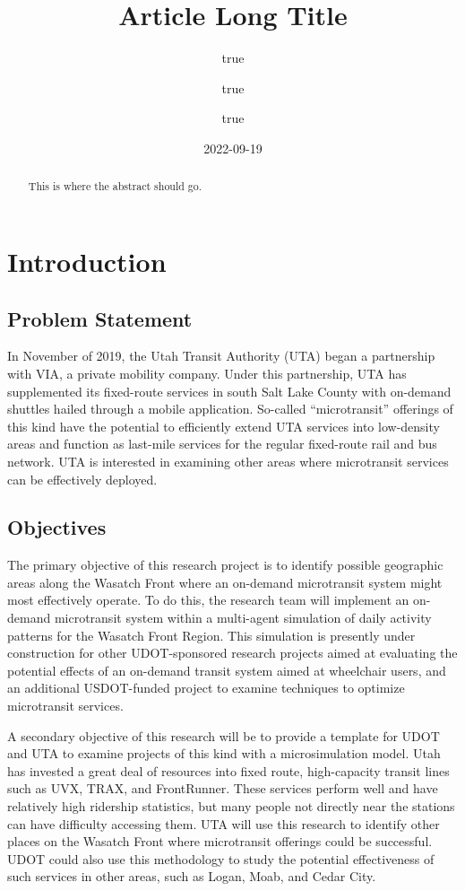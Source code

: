 \documentclass[
]{article}
\title{Article Long Title}
\author{true \and true \and true}
\date{2022-09-19}
\begin{document}
\maketitle
\begin{abstract}
This is where the abstract should go.
\end{abstract}

{
\setcounter{tocdepth}{2}
\tableofcontents
}
\hypertarget{introduction}{%
\section{Introduction}\label{introduction}}

\hypertarget{problem-statement}{%
\subsection{Problem Statement}\label{problem-statement}}

In November of 2019, the Utah Transit Authority (UTA) began a partnership with VIA, a private mobility company. Under this partnership, UTA has supplemented its fixed-route services in south Salt Lake County with on-demand shuttles hailed through a mobile application. So-called ``microtransit'' offerings of this kind have the potential to efficiently extend UTA services into low-density areas and function as last-mile services for the regular fixed-route rail and bus network. UTA is interested in examining other areas where microtransit services can be effectively deployed.

\hypertarget{objectives}{%
\subsection{Objectives}\label{objectives}}

The primary objective of this research project is to identify possible geographic areas along the Wasatch Front where an on-demand microtransit system might most effectively operate. To do this, the research team will implement an on-demand microtransit system within a multi-agent simulation of daily activity patterns for the Wasatch Front Region. This simulation is presently under construction for other UDOT-sponsored research projects aimed at evaluating the potential effects of an on-demand transit system aimed at wheelchair users, and an additional USDOT-funded project to examine techniques to optimize microtransit services.

A secondary objective of this research will be to provide a template for UDOT and UTA to examine projects of this kind with a microsimulation model. Utah has invested a great deal of resources into fixed route, high-capacity transit lines such as UVX, TRAX, and FrontRunner. These services perform well and have relatively high ridership statistics, but many people not directly near the stations can have difficulty accessing them. UTA will use this research to identify other places on the Wasatch Front where microtransit offerings could be successful. UDOT could also use this methodology to study the potential effectiveness of such services in other areas, such as Logan, Moab, and Cedar City.
\end{document}
